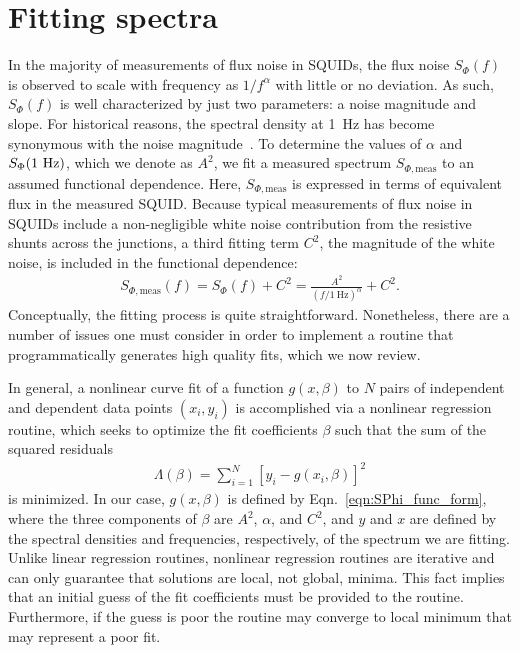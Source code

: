 \chapter{Fitting spectra}
\label{App:fitting}

In the majority of measurements of flux noise in SQUIDs, the flux noise $S_\Phi(f)$ is observed to scale with frequency as $1/f^\alpha$ with little or no deviation. As such, $S_\Phi(f)$ is well characterized by just two parameters: a noise magnitude and slope. For historical reasons, the spectral density at 1~Hz has become synonymous with the noise magnitude~\citep{Koch:JLTP:1983}. To determine the values of $\alpha$ and $S_\Phi(1~\text{Hz})$, which we denote as $A^2$, we fit a measured spectrum $S_{\Phi,\text{meas}}$ to an assumed functional dependence. Here, $S_{\Phi,\text{meas}}$ is expressed in terms of equivalent flux in the measured SQUID. Because typical measurements of flux noise in SQUIDs include a non-negligible white noise contribution from the resistive shunts across the junctions, a third fitting term $C^2$, the magnitude of the white noise, is included in the functional dependence:
\begin{align}\label{eqn:SPhi_func_form}
S_{\Phi,\text{meas}}(f) = S_\Phi(f) + C^2 = \frac{A^2}{(f/1~\text{Hz})^\alpha} + C^2.
\end{align}
Conceptually, the fitting process is quite straightforward. Nonetheless, there are a number of issues one must consider in order to implement a routine that programmatically generates high quality fits, which we now review.

In general, a nonlinear curve fit of a function $g(x,\beta)$ to $N$ pairs of independent and dependent data points $(x_i,y_i)$ is accomplished via a nonlinear regression routine, which seeks to optimize the fit coefficients $\beta$ such that the sum of the squared residuals
\begin{align}\label{eqn:sum_squared_residuals}
\Lambda(\beta) = \sum_{i=1}^N [y_i - g(x_i,\beta)]^2
\end{align}
is minimized. In our case, $g(x,\beta)$ is defined by Eqn.~\eqref{eqn:SPhi_func_form}, where the three components of $\beta$ are $A^2$, $\alpha$, and $C^2$, and $y$ and $x$ are defined by the spectral densities and frequencies, respectively, of the spectrum we are fitting. Unlike linear regression routines, nonlinear regression routines are iterative and can only guarantee that solutions are local, not global, minima. This fact implies that an initial guess of the fit coefficients must be provided to the routine. Furthermore, if the guess is poor the routine may converge to local minimum that may represent a poor fit.

